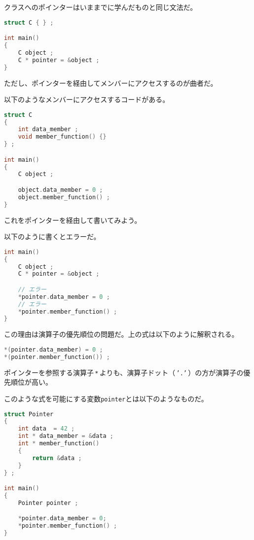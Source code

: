 クラスへのポインターはいままでに学んだものと同じ文法だ。

\begin{lstlisting}[language={C++}]
struct C { } ;

int main()
{
    C object ;
    C * pointer = &object ;
} 
\end{lstlisting}

ただし、ポインターを経由してメンバーにアクセスするのが曲者だ。

以下のようなメンバーにアクセスするコードがある。

\begin{lstlisting}[language={C++}]
struct C
{
    int data_member ;
    void member_function() {}
} ;

int main()
{
    C object ;

    object.data_member = 0 ;
    object.member_function() ;
}
\end{lstlisting}

これをポインターを経由して書いてみよう。

以下のように書くとエラーだ。

\begin{lstlisting}[language={C++}]
int main()
{
    C object ;
    C * pointer = &object ;

    // エラー
    *pointer.data_member = 0 ;
    // エラー
    *pointer.member_function() ;
}
\end{lstlisting}

この理由は演算子の優先順位の問題だ。上の式は以下のように解釈される。

\begin{lstlisting}[language={C++}]
*(pointer.data_member) = 0 ;
*(pointer.member_function()) ;
\end{lstlisting}

ポインターを参照する演算子\,\texttt{*}\,よりも、演算子ドット（\,\texttt{'.'}\,）の方が演算子の優先順位が高い。

このような式を可能にする変数\texttt{pointer}とは以下のようなものだ。

\begin{lstlisting}[language={C++}]
struct Pointer
{
    int data  = 42 ;
    int * data_member = &data ;
    int * member_function()
    {
        return &data ;
    }
} ;

int main()
{
    Pointer pointer ;

    *pointer.data_member = 0;
    *pointer.member_function() ;
}
\end{lstlisting}

